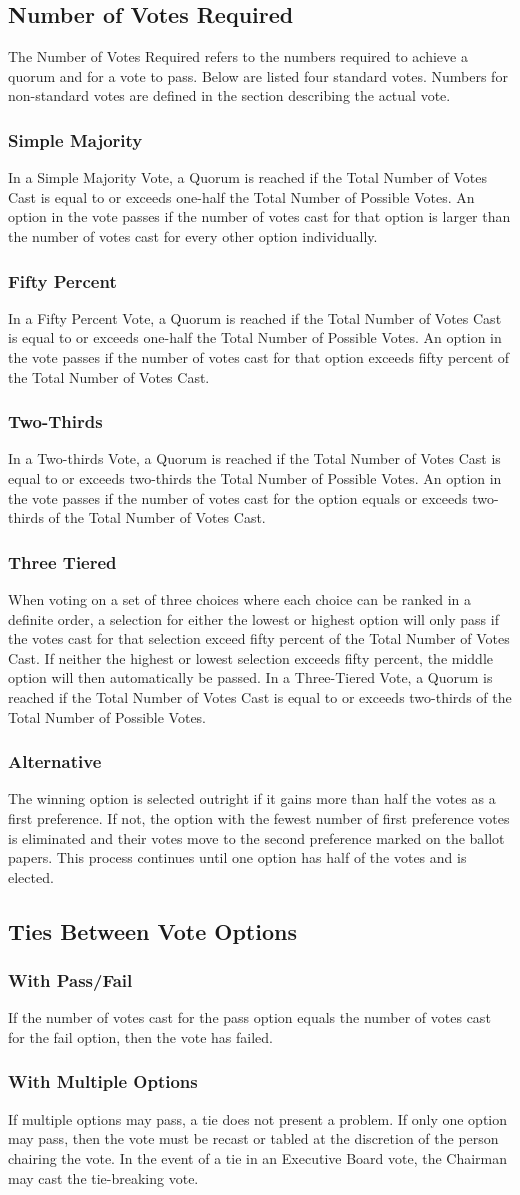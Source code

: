 \documentclass{article}
\newcommand{\asection}[1]{\subsection{#1} \label{#1}}
\newcommand{\asubsection}[1]{\subsubsection{#1} \label{#1}}
\begin{document}
\asection{Number of Votes Required}
The Number of Votes Required refers to the numbers required to achieve a quorum and for a vote to pass.
Below are listed four standard votes.
Numbers for non-standard votes are defined in the section describing the actual vote.
\asubsection{Simple Majority}
In a Simple Majority Vote, a Quorum is reached if the Total Number of Votes Cast is equal to or exceeds one-half the Total Number of Possible Votes.
An option in the vote passes if the number of votes cast for that option is larger than the number of votes cast for every other option individually.
\asubsection{Fifty Percent}
In a Fifty Percent Vote, a Quorum is reached if the Total Number of Votes Cast is equal to or exceeds one-half the Total Number of Possible Votes.
An option in the vote passes if the number of votes cast for that option exceeds fifty percent of the Total Number of Votes Cast.
\asubsection{Two-Thirds}
In a Two-thirds Vote, a Quorum is reached if the Total Number of Votes Cast is equal to or exceeds two-thirds the Total Number of Possible Votes.
An option in the vote passes if the number of votes cast for the option equals or exceeds two-thirds of the Total Number of Votes Cast.
\asubsection{Three Tiered}
When voting on a set of three choices where each choice can be ranked in a definite order, a selection for either the lowest or highest option will only pass if the votes cast for that selection exceed fifty percent of the Total Number of Votes Cast.
If neither the highest or lowest selection exceeds fifty percent, the middle option will then automatically be passed.
In a Three-Tiered Vote, a Quorum is reached if the Total Number of Votes Cast is equal to or exceeds two-thirds of the Total Number of Possible Votes.

\asubsection{Alternative}
The winning option is selected outright if it gains more than half the votes as a first preference. If not, the option with the fewest number of first preference votes is eliminated and their votes move to the second preference marked on the ballot papers. This process continues until one option has half of the votes and is elected.

\asection{Ties Between Vote Options}
\asubsection{With Pass/Fail}
If the number of votes cast for the pass option equals the number of votes cast for the fail option, then the vote has failed.
\asubsection{With Multiple Options}
If multiple options may pass, a tie does not present a problem.
If only one option may pass, then the vote must be recast or tabled at the discretion of the person chairing the vote.
In the event of a tie in an Executive Board vote, the Chairman may cast the tie-breaking vote.
\end{document}
